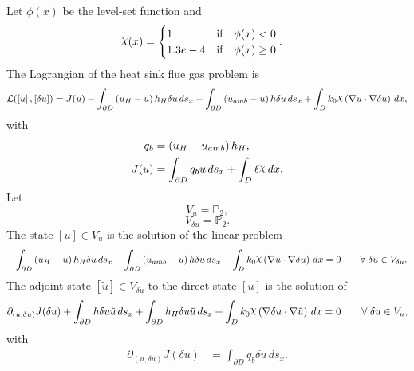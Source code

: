\documentclass[preview]{standalone}
\let\oldcdot\cdot
\let\cdot\oldcdot
\begin{document}
Let $\phi(x)$ be the level-set function and
 \begin{align*}\raisebox{\depth}{$\chi$}(x) &= \begin{cases} 1 & \mbox{if}\quad \phi(x) < 0 \\ 1.3e-4 & \mbox{if}\quad \phi(x)  \ge 0 \end{cases}.\end{align*}
The Lagrangian of the heat sink flue gas problem is
\begin{dmath*}
\mathcal L(\left[ u\right],\left[ \delta u\right]) = J(u) -  \int_{\partial D} \left(u_{H} - u\right) h_{H} \delta u \,ds_x -  \int_{\partial D} \left(u_{amb} - u\right) h \delta u \,ds_x +  \int_{D} k_{0} \raisebox{\depth}{$\chi$} \left(  \nabla u  \cdot  \nabla \delta u  \right) \,dx , 
\end{dmath*}
with 
\begin{align*}
q_{b} &= \left(u_{H} - u_{amb}\right) h_{H},\\
J(u) &=  \int_{\partial D} q_{b} u \,ds_x +  \int_{D} \ell \raisebox{\depth}{$\chi$} \,dx.
 \end{align*}
Let
\begin{equation*}
V_{u} = \mathbb P_{2},\end{equation*}
\begin{equation*}
V_{\delta u} = \mathbb P_{2}.\end{equation*}
The state $\left[ u\right] \in  V_{u}$ is the solution of the linear problem
\begin{dmath*}
-  \int_{\partial D} \left(u_{H} - u\right) h_{H} \delta u \,ds_x -  \int_{\partial D} \left(u_{amb} - u\right) h \delta u \,ds_x +  \int_{D} k_{0} \raisebox{\depth}{$\chi$} \left(  \nabla u  \cdot  \nabla \delta u  \right) \,dx = 0\qquad \forall\; {\delta u\in V_{\delta u}} . 
\end{dmath*}
The adjoint state $\left[ \tilde u\right] \in  V_{\delta u}$ to the direct state $\left[ u\right]$ is the solution of
\begin{dmath*}
\partial_{(u,\delta u)} J(\delta u) +  \int_{\partial D} h \delta u \tilde u \,ds_x +  \int_{\partial D} h_{H} \delta u \tilde u \,ds_x +  \int_{D} k_{0} \raisebox{\depth}{$\chi$} \left(  \nabla \delta u  \cdot  \nabla \tilde u  \right) \,dx = 0\qquad \forall\; {\delta u\in V_{u}} , 
\end{dmath*}
with 
\begin{align*}
\partial_{(u,\delta u)} J(\delta u) &=  \int_{\partial D} q_{b} \delta u \,ds_x.
 \end{align*}
\end{document}
